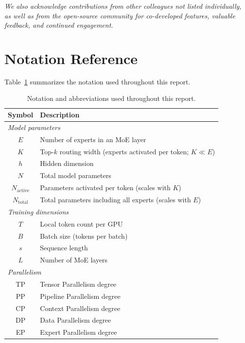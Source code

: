 \documentclass[10pt,logo,copyright]{nvidiatechreport}
\begin{document}
\vspace{0.5em}
\noindent\textit{We also acknowledge contributions from other colleagues not listed individually, as well as from the open-source community for co-developed features, valuable feedback, and continued engagement.}




\newpage
\appendix

\section{Notation Reference}\label{sec:notation}

Table~\ref{tab:notation} summarizes the notation used throughout this report.

\begin{table}[ht]
\centering
\caption{Notation and abbreviations used throughout this report.}
\label{tab:notation}
\begin{tabular}{cl}
\toprule
\textbf{Symbol} & \textbf{Description} \\
\midrule
\multicolumn{2}{l}{\emph{Model parameters}} \\
$E$ & Number of experts in an MoE layer \\
$K$ & Top-$k$ routing width (experts activated per token; $K \ll E$) \\
$h$ & Hidden dimension \\
$N$ & Total model parameters \\
$N_{\text{active}}$ & Parameters activated per token (scales with $K$) \\
$N_{\text{total}}$ & Total parameters including all experts (scales with $E$) \\
\midrule
\multicolumn{2}{l}{\emph{Training dimensions}} \\
$T$ & Local token count per GPU \\
$B$ & Batch size (tokens per batch) \\
$s$ & Sequence length \\
$L$ & Number of MoE layers \\
\midrule
\multicolumn{2}{l}{\emph{Parallelism}} \\
TP & Tensor Parallelism degree \\
PP & Pipeline Parallelism degree \\
CP & Context Parallelism degree \\
DP & Data Parallelism degree \\
EP & Expert Parallelism degree \\

\end{tabular}
\end{table}
\end{document}
